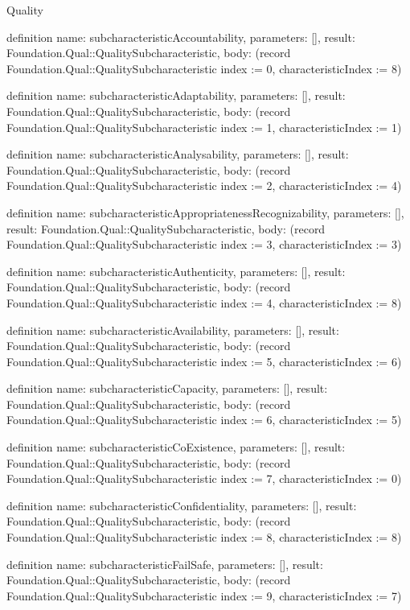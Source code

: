 \begin{lexlean}{Quality}
\begin{semanticmodule}
definition{
  name: subcharacteristicAccountability,
  parameters: [],
  result: Foundation.Qual::QualitySubcharacteristic,
  body: (record Foundation.Qual::QualitySubcharacteristic {index := 0, characteristicIndex := 8})
}

definition{
  name: subcharacteristicAdaptability,
  parameters: [],
  result: Foundation.Qual::QualitySubcharacteristic,
  body: (record Foundation.Qual::QualitySubcharacteristic {index := 1, characteristicIndex := 1})
}

definition{
  name: subcharacteristicAnalysability,
  parameters: [],
  result: Foundation.Qual::QualitySubcharacteristic,
  body: (record Foundation.Qual::QualitySubcharacteristic {index := 2, characteristicIndex := 4})
}

definition{
  name: subcharacteristicAppropriatenessRecognizability,
  parameters: [],
  result: Foundation.Qual::QualitySubcharacteristic,
  body: (record Foundation.Qual::QualitySubcharacteristic {index := 3, characteristicIndex := 3})
}

definition{
  name: subcharacteristicAuthenticity,
  parameters: [],
  result: Foundation.Qual::QualitySubcharacteristic,
  body: (record Foundation.Qual::QualitySubcharacteristic {index := 4, characteristicIndex := 8})
}

definition{
  name: subcharacteristicAvailability,
  parameters: [],
  result: Foundation.Qual::QualitySubcharacteristic,
  body: (record Foundation.Qual::QualitySubcharacteristic {index := 5, characteristicIndex := 6})
}

definition{
  name: subcharacteristicCapacity,
  parameters: [],
  result: Foundation.Qual::QualitySubcharacteristic,
  body: (record Foundation.Qual::QualitySubcharacteristic {index := 6, characteristicIndex := 5})
}

definition{
  name: subcharacteristicCoExistence,
  parameters: [],
  result: Foundation.Qual::QualitySubcharacteristic,
  body: (record Foundation.Qual::QualitySubcharacteristic {index := 7, characteristicIndex := 0})
}

definition{
  name: subcharacteristicConfidentiality,
  parameters: [],
  result: Foundation.Qual::QualitySubcharacteristic,
  body: (record Foundation.Qual::QualitySubcharacteristic {index := 8, characteristicIndex := 8})
}

definition{
  name: subcharacteristicFailSafe,
  parameters: [],
  result: Foundation.Qual::QualitySubcharacteristic,
  body: (record Foundation.Qual::QualitySubcharacteristic {index := 9, characteristicIndex := 7})
}


\end{semanticmodule}
\end{lexlean}
